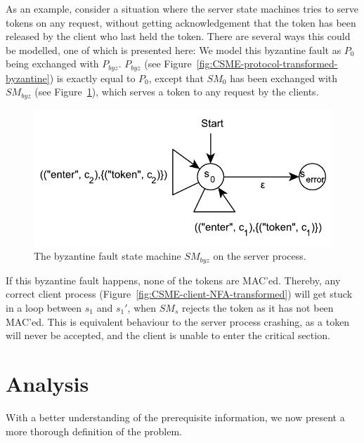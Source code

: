 \documentclass{article}
\begin{document}
		As an example, consider a situation where the server state machines tries to serve tokens on any request, without getting acknowledgement that the token has been released by the client who last held the token.
		There are several ways this could be modelled, one of which is presented here:
		We model this byzantine fault as $P_0$ being exchanged with $P_{byz}$.
		$P_{byz}$ (see Figure~\ref{fig:CSME-protocol-transformed-byzantine}) is exactly equal to $P_0$, except that $SM_0$ has been exchanged with $SM_{byz}$ (see Figure~\ref{fig:CSME-server-NFA-transformed-byzantine}), which serves a token to any request by the clients.

		\begin{figure}[ht]
			\center
			\includegraphics[scale=0.6]{figures/state-machines/CSME-server-NFA-transformed-byzantine.pdf}
			\caption{The byzantine fault state machine $SM_{byz}$ on the server process.\label{fig:CSME-server-NFA-transformed-byzantine}}
		\end{figure}
		\FloatBarrier

		If this byzantine fault happens, none of the tokens are MAC'ed.
		Thereby, any correct client process (Figure~\ref{fig:CSME-client-NFA-transformed}) will get stuck in a loop between $s_1$ and $s_1'$, when $SM_s$ rejects the token as it has not been MAC'ed.
		This is equivalent behaviour to the server process crashing, as a token will never be accepted, and the client is unable to enter the critical section.

	\section{Analysis}
	\label{sec:analysis}

	With a better understanding of the prerequisite information, we now present a more thorough definition of the problem.
\end{document}
